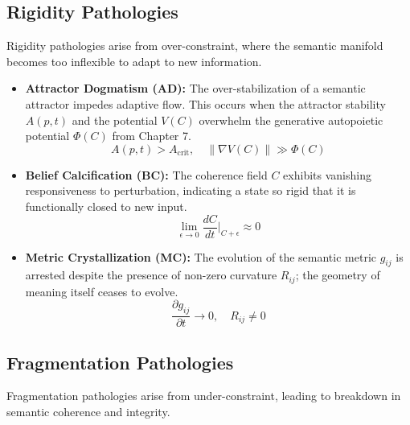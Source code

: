 \subsection{Rigidity Pathologies}

Rigidity pathologies arise from over-constraint, where the semantic manifold becomes too inflexible to adapt to new information.

\begin{itemize}
    \item \textbf{Attractor Dogmatism (AD):} The over-stabilization of a semantic attractor impedes adaptive flow. This occurs when the attractor stability \(A(p,t)\) and the potential \(V(C)\) overwhelm the generative autopoietic potential \(\Phi(C)\) from Chapter 7.
    \begin{equation}
    A(p,t) > A_{\text{crit}}, \quad \|\nabla V(C)\| \gg \Phi(C)
    \end{equation}

    \item \textbf{Belief Calcification (BC):} The coherence field \(C\) exhibits vanishing responsiveness to perturbation, indicating a state so rigid that it is functionally closed to new input.
    \begin{equation}
    \lim_{\epsilon \to 0} \frac{dC}{dt}\bigg|_{C+\epsilon} \approx 0
    \end{equation}

    \item \textbf{Metric Crystallization (MC):} The evolution of the semantic metric \(g_{ij}\) is arrested despite the presence of non-zero curvature \(R_{ij}\); the geometry of meaning itself ceases to evolve.
    \begin{equation}
    \frac{\partial g_{ij}}{\partial t} \to 0, \quad R_{ij} \neq 0
    \end{equation}
\end{itemize}

\subsection{Fragmentation Pathologies}

Fragmentation pathologies arise from under-constraint, leading to breakdown in semantic coherence and integrity.

